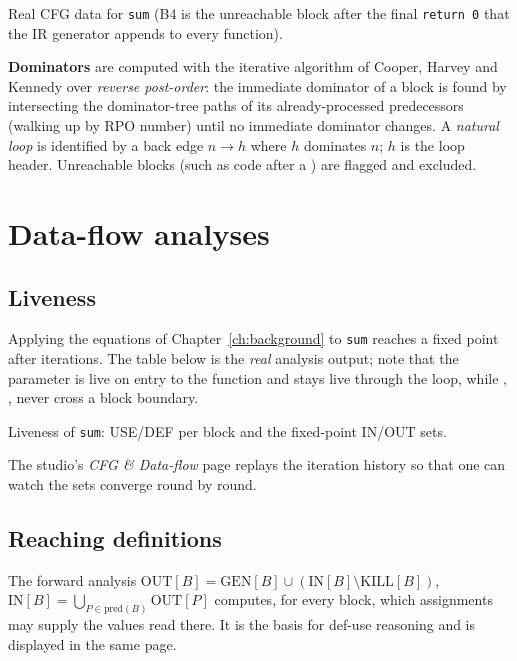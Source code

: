 \begin{table}[H]\centering\small\begin{adjustbox}{max width=\textwidth}\end{adjustbox}\caption{Real CFG data for \texttt{sum} (B4 is the unreachable block after the final \texttt{return 0} that the IR generator appends to every function).}\end{table}

\textbf{Dominators} are computed with the iterative algorithm of Cooper, Harvey and Kennedy over \emph{reverse post-order}: the immediate dominator of a block is found by intersecting the dominator-tree paths of its already-processed predecessors (walking up by RPO number) until no immediate dominator changes. A \emph{natural loop} is identified by a back edge $n\to h$ where $h$ dominates $n$; $h$ is the loop header. Unreachable blocks (such as code after a ) are flagged and excluded.

\section{Data-flow analyses}
\subsection{Liveness}
Applying the equations of Chapter~\ref{ch:background} to \texttt{sum} reaches a fixed point after \LoopLivenessIters{} iterations. The table below is the \emph{real} analysis output; note that the parameter  is live on entry to the function and stays live through the loop, while , ,  never cross a block boundary.

\begin{table}[H]\centering\small\begin{adjustbox}{max width=\textwidth}\end{adjustbox}\caption{Liveness of \texttt{sum}: USE/DEF per block and the fixed-point IN/OUT sets.}\end{table}

The studio's \emph{CFG \& Data-flow} page replays the iteration history so that one can watch the sets converge round by round.

\subsection{Reaching definitions}
The forward analysis $\mathrm{OUT}[B]=\mathrm{GEN}[B]\cup(\mathrm{IN}[B]\setminus\mathrm{KILL}[B])$, $\mathrm{IN}[B]=\bigcup_{P\in\mathrm{pred}(B)}\mathrm{OUT}[P]$ computes, for every block, which assignments may supply the values read there. It is the basis for def-use reasoning and is displayed in the same page.

